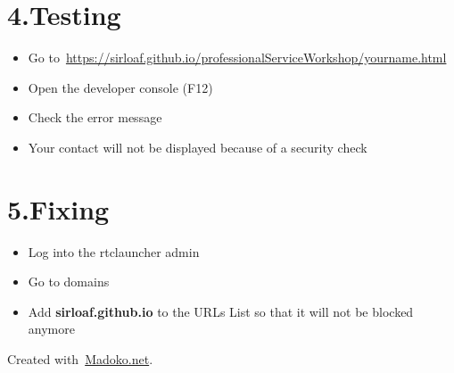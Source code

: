 \documentclass{article}
\begin{document}
\section{4.\hspace*{0.5em}Testing}\label{sec-testing}%

\begin{itemize}[noitemsep,topsep=\mdcompacttopsep]%

\item{}Go to~\href{https://sirloaf.github.io/professionalServiceWorkshop/yourname.html}{https://sirloaf.github.io/professionalServiceWorkshop/yourname.html}%

\item{}Open the developer console (F12)%

\item{}Check the error message%

\item{}Your contact will not be displayed because of a security check%
\end{itemize}%

\section{5.\hspace*{0.5em}Fixing}\label{sec-fixing}%

\begin{itemize}[noitemsep,topsep=\mdcompacttopsep]%

\item{}Log into the rtclauncher admin%

\item{}Go to domains%

\item{}Add \textbf{sirloaf.github.io} to the URLs List so that it will not be blocked anymore%
\end{itemize}%

\begin{mdbmargintb}{4em}{}%
\begin{mdflushright}%
{\tiny{}Created with~\href{https://www.madoko.net}{Madoko.net}.}%
\end{mdflushright}%
\end{mdbmargintb}%
\end{document}
